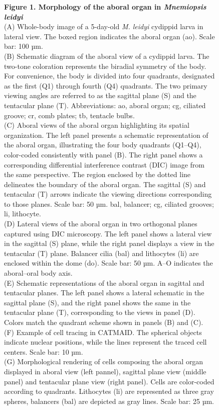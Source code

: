 \documentclass[
  11pt,
]{article}
\begin{document}
\begin{figure}[H]
\caption{\textbf{Figure 1. Morphology of the aboral organ in
\emph{Mnemiopsis leidyi}}\\
(A) Whole-body image of a 5-day-old \emph{M. leidyi} cydippid larva in
lateral view. The boxed region indicates the aboral organ (ao). Scale
bar: 100 µm.\\
(B) Schematic diagram of the aboral view of a cydippid larva. The
two-tone coloration represents the biradial symmetry of the body. For
convenience, the body is divided into four quadrants, designated as the
first (Q1) through fourth (Q4) quadrants. The two primary viewing angles
are referred to as the sagittal plane (S) and the tentacular plane (T).
Abbreviations: ao, aboral organ; cg, ciliated groove; cr, comb plates;
tb, tentacle bulbs.\\
(C) Aboral views of the aboral organ highlighting its spatial
organization. The left panel presents a schematic representation of the
aboral organ, illustrating the four body quadrants (Q1--Q4), color-coded
consistently with panel (B). The right panel shows a corresponding
differential interference contrast (DIC) image from the same
perspective. The region enclosed by the dotted line delineates the
boundary of the aboral organ. The sagittal (S) and tentacular (T) arrows
indicate the viewing directions corresponding to those planes. Scale
bar: 50 µm. bal, balancer; cg, ciliated grooves; li, lithocyte.\\
(D) Lateral views of the aboral organ in two orthogonal planes captured
using DIC microscopy. The left panel shows a lateral view in the
sagittal (S) plane, while the right panel displays a view in the
tentacular (T) plane. Balancer cilia (bal) and lithocytes (li) are
enclosed within the dome (do). Scale bar: 50 µm. A--O indicates the
aboral--oral body axis.\\
(E) Schematic representations of the aboral organ in sagittal and
tentacular planes. The left panel shows a lateral schematic in the
sagittal plane (S), and the right panel shows the same in the tentacular
plane (T), corresponding to the views in panel (D). Colors match the
quadrant scheme shown in panels (B) and (C).\\
(F) Example of cell tracing in CATMAID. The spherical objects indicate
nuclear positions, while the lines represent the traced cell centers.
Scale bar: 10 µm.\\
(G) Morphological rendering of cells composing the aboral organ
displayed in aboral view (left pannel), sagittal plane view (middle
panel) and tentacular plane view (right panel). Cells are color-coded
according to quadrants. Lithocytes (li) are represented as three gray
spheres, balancers (bal) are depicted as gray lines. Scale bar: 25 µm.}

\end{figure}%
\end{document}
